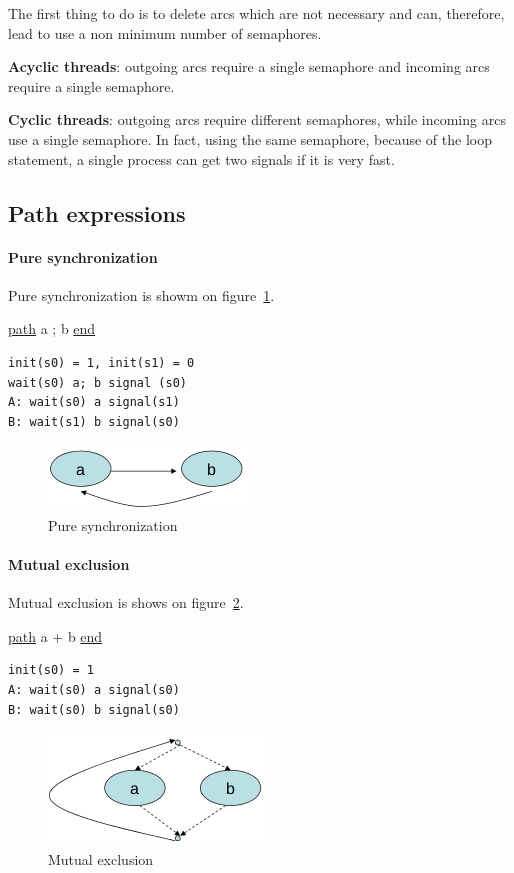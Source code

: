 The first thing to do is to delete arcs which are not necessary and can, therefore, lead to use a non minimum number of semaphores.

\textbf{Acyclic threads}: outgoing arcs require a single semaphore and incoming arcs require a single semaphore.

\textbf{Cyclic threads}: outgoing arcs require different semaphores, while incoming arcs use a single  semaphore. In fact, using the same semaphore, because of the loop statement, a single process can get two signals if it is very fast.

\subsection{Path expressions}
\paragraph{Pure synchronization}
Pure synchronization is showm on figure~\ref{img:puresync}.

\underline{path} a ; b \underline{end}
\begin{verbatim}
init(s0) = 1, init(s1) = 0
wait(s0) a; b signal (s0)
A: wait(s0) a signal(s1)
B: wait(s1) b signal(s0)
\end{verbatim}

\begin{figure}[hbtp]
\centering
\includegraphics[scale=0.6]{images/synchronization/pathexp_puresynchronization.png}
\caption{Pure synchronization}
\label{img:puresync}
\end{figure}

\paragraph{Mutual exclusion}
Mutual exclusion is shows on figure~\ref{img:mutex}.

\underline{path} a + b \underline{end}
\begin{verbatim}
init(s0) = 1
A: wait(s0) a signal(s0)
B: wait(s0) b signal(s0)
\end{verbatim}

\begin{figure}[hbtp]
\centering
\includegraphics[scale=0.6]{images/synchronization/pathexp_mutex.png}
\caption{Mutual exclusion}
\label{img:mutex}
\end{figure}

